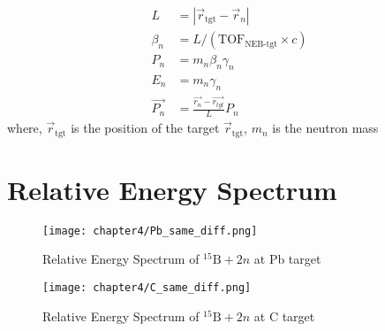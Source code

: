 \begin{align}
    L &= | \vec{r}_{\text{tgt}} - \vec{r}_{n} | \\
    \beta_{n} &= L / (\text{TOF}_{\text{NEB-tgt}} \times c) \\
    P_{n} &= m_{n} \beta_{n} \gamma_{n} \\
    E_{n} &= m_{n} \gamma_{n} \\
    \vec{P_{n}} &= \frac{\vec{r_{n}} - \vec{r_{tgt}}}{L} P_{n}
\end{align}
where, $\vec{r}_{\text{tgt}}$ is the position of the target $\vec{r}_{\text{tgt}}$, $m_{n}$ is the neutron mass


\section{Relative Energy Spectrum}

\begin{figure}[h]
    \centering
    \texttt{[image: chapter4/Pb\_same\_diff.png]}
    \caption{Relative Energy Spectrum of ${}^{15}\text{B} + 2n$ at Pb target}
\end{figure}
\begin{figure}[h]
    \centering
    \texttt{[image: chapter4/C\_same\_diff.png]}
    \caption{Relative Energy Spectrum of ${}^{15}\text{B} + 2n$ at C target}
\end{figure}

